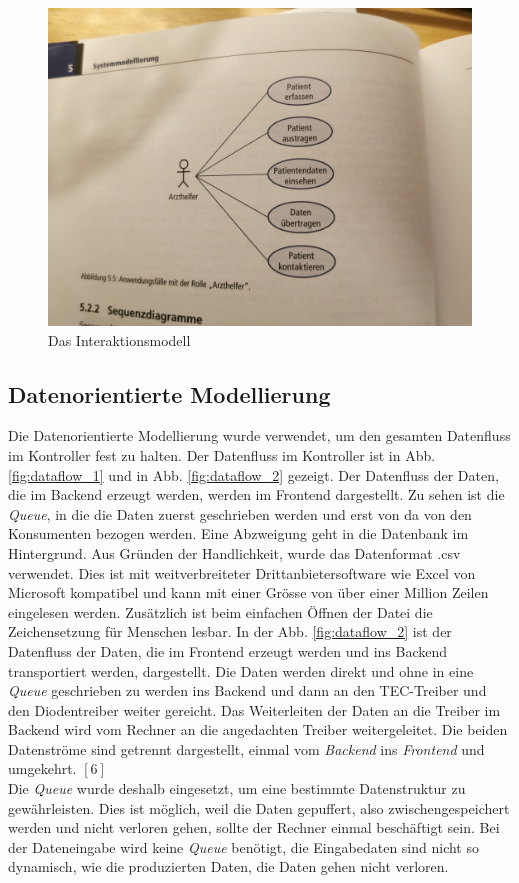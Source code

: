 \begin{figure}[H]
    \centering
    \includegraphics[scale=0.09]{98_images/interaktionsmodell.jpg}
    \caption{Das Interaktionsmodell}
    \label{fig:interaktionsmodell}
\end{figure}

\subsection{Datenorientierte Modellierung}
Die Datenorientierte Modellierung wurde verwendet, um den gesamten Datenfluss im Kontroller fest zu halten. Der Datenfluss im Kontroller ist in Abb. \ref{fig:dataflow_1} und in Abb. \ref{fig:dataflow_2} gezeigt. Der Datenfluss der Daten, die im Backend erzeugt werden, werden im Frontend dargestellt. Zu sehen ist die \textit{Queue}, in die die Daten zuerst geschrieben werden und erst von da von den Konsumenten bezogen werden. Eine Abzweigung geht in die Datenbank im Hintergrund. Aus Gründen der Handlichkeit, wurde das Datenformat .csv verwendet. Dies ist mit weitverbreiteter Drittanbietersoftware wie Excel von Microsoft kompatibel und kann mit einer Grösse von über einer Million Zeilen eingelesen werden. Zusätzlich ist beim einfachen Öffnen der Datei die Zeichensetzung für Menschen lesbar. In der Abb. \ref{fig:dataflow_2} ist der Datenfluss der Daten, die im Frontend erzeugt werden und ins Backend transportiert werden, dargestellt. Die Daten werden direkt und ohne in eine \textit{Queue} geschrieben zu werden ins Backend und dann an den TEC-Treiber und den Diodentreiber weiter gereicht. Das Weiterleiten der Daten an die Treiber im Backend wird vom Rechner an die angedachten Treiber weitergeleitet. Die beiden Datenströme sind getrennt dargestellt, einmal vom \textit{Backend} ins \textit{Frontend} und umgekehrt. $[6]$\\  %
Die \textit{Queue} wurde deshalb eingesetzt, um eine bestimmte Datenstruktur zu gewährleisten. Dies ist möglich, weil die Daten gepuffert, also zwischengespeichert werden und nicht verloren gehen, sollte der Rechner einmal beschäftigt sein. Bei der Dateneingabe wird keine \textit{Queue} benötigt, die Eingabedaten sind nicht so dynamisch, wie die produzierten Daten, die Daten gehen nicht verloren.


